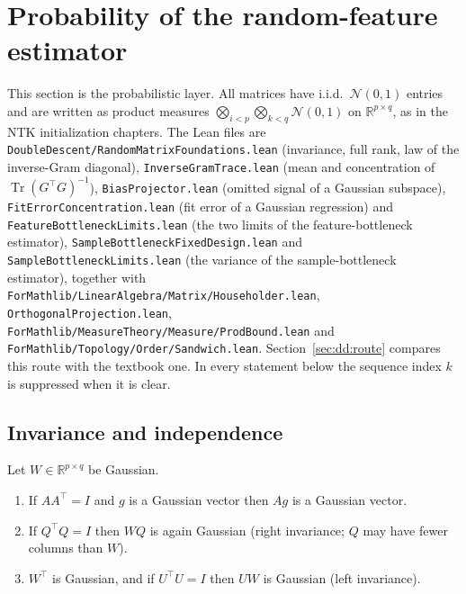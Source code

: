 \section{Probability of the random-feature estimator}\label{sec:dd:gaussian}

This section is the probabilistic layer. All matrices have i.i.d.\ $\mathcal N(0,1)$ entries and are written as product measures
$\bigotimes_{i<p}\bigotimes_{k<q}\mathcal N(0,1)$ on $\mathbb R^{p\times q}$, as in the NTK initialization chapters. The Lean files are
\texttt{DoubleDescent/RandomMatrixFoundations.lean} (invariance, full rank, law of the inverse-Gram diagonal),
\texttt{InverseGramTrace.lean} (mean and concentration of $\operatorname{Tr}(G^\top G)^{-1}$),
\texttt{BiasProjector.lean} (omitted signal of a Gaussian subspace), \texttt{FitErrorConcentration.lean} (fit error of a Gaussian regression) and
\texttt{FeatureBottleneckLimits.lean} (the two limits of the feature-bottleneck estimator),
\texttt{SampleBottleneckFixedDesign.lean} and \texttt{SampleBottleneckLimits.lean} (the variance of the sample-bottleneck estimator), together with
\texttt{ForMathlib/LinearAlgebra/Matrix/Householder.lean}, \texttt{OrthogonalProjection.lean}, \texttt{ForMathlib/MeasureTheory/Measure/ProdBound.lean} and \texttt{ForMathlib/Topology/Order/Sandwich.lean}. Section~\ref{sec:dd:route} compares this route
with the textbook one. In every statement below the sequence index $k$ is suppressed when it is clear.

\subsection{Invariance and independence}

\begin{lemma}\label{lem:dd:invariance}
  \leanok
Let $W\in\mathbb R^{p\times q}$ be Gaussian.
\begin{enumerate}
  \item If $AA^\top=I$ and $g$ is a Gaussian vector then $Ag$ is a Gaussian vector.
  \item If $Q^\top Q=I$ then $WQ$ is again Gaussian (right invariance; $Q$ may have fewer columns than $W$).
  \item $W^\top$ is Gaussian, and if $U^\top U=I$ then $UW$ is Gaussian (left invariance).
\end{enumerate}
\end{lemma}

